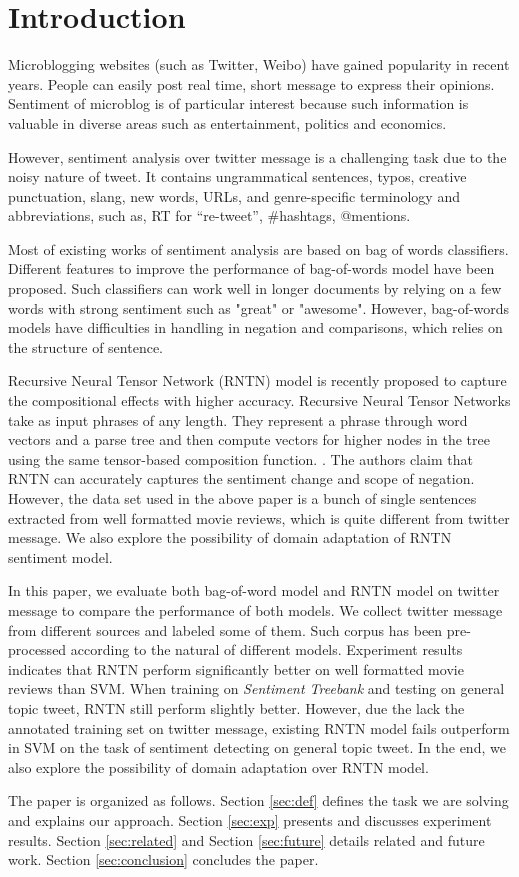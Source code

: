 \section{Introduction}

Microblogging websites (such as Twitter, Weibo) have gained popularity in recent years. People can easily post real time, short message to express their opinions. 
Sentiment of microblog is of particular interest because such information is valuable in diverse areas such as entertainment, politics and economics.

However, sentiment analysis over twitter message is a challenging task due to the noisy nature of tweet. 
It contains ungrammatical sentences, typos, creative punctuation, slang, new words, URLs, and genre-specific terminology and abbreviations, such as, RT for “re-tweet”, \#hashtags, @mentions. 

Most of existing works of sentiment analysis are based on bag of words classifiers. Different features to improve the performance of bag-of-words model have been proposed\cite{Agarwal:2011}. Such classifiers can work well in longer documents by relying on a few words with strong sentiment such as "great" or "awesome". However, bag-of-words models have difficulties in handling in negation and comparisons, which relies on the structure of sentence. 

Recursive Neural Tensor Network (RNTN) model is recently proposed to capture the compositional effects with higher accuracy. Recursive Neural Tensor Networks take as input phrases of any length. They represent a phrase through word vectors and a parse tree and then compute vectors for higher nodes in the tree using the same tensor-based composition function. \cite{Socher:2013}. The authors claim that RNTN can accurately captures the sentiment change and scope of negation. However, the data set used in the above paper is a bunch of single sentences extracted from well formatted movie reviews, which is quite different from twitter message. We also explore the possibility of domain adaptation of RNTN sentiment model. 

In this paper, we evaluate both bag-of-word model and RNTN model on twitter message to compare the performance of both models. We collect twitter message from different sources and labeled some of them. Such corpus has been pre-processed according to the natural of different models. Experiment results indicates that RNTN perform significantly better on well formatted movie reviews than SVM. When training on \textit{Sentiment Treebank} and testing on general topic tweet, RNTN still perform slightly better. However, due the lack the annotated training set on twitter message, existing RNTN model fails outperform in SVM on the task of sentiment detecting on general topic tweet. In the end, we also explore the possibility of domain adaptation over RNTN model.  
\newpage


The paper is organized as follows. Section \ref{sec:def} defines the task we are solving and explains our approach. 
Section \ref{sec:exp} presents and discusses experiment results. Section \ref{sec:related} and Section \ref{sec:future} details related and future work. Section \ref{sec:conclusion} concludes the paper.
